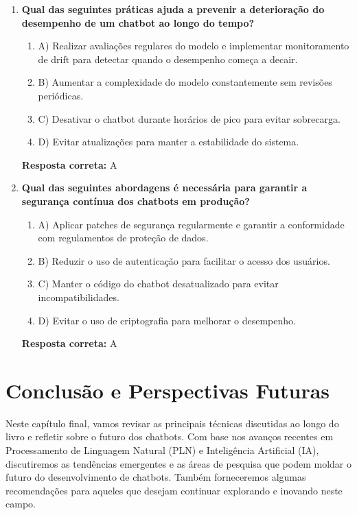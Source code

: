 \documentclass[14pt,a4paper,oneside]{book}
\begin{document}
\begin{enumerate}
	\item \textbf{Qual das seguintes práticas ajuda a prevenir a deterioração do desempenho de um chatbot ao longo do tempo?}
	\begin{enumerate}[label=\alph*)]
		\item A) Realizar avaliações regulares do modelo e implementar monitoramento de drift para detectar quando o desempenho começa a decair.
		\item B) Aumentar a complexidade do modelo constantemente sem revisões periódicas.
		\item C) Desativar o chatbot durante horários de pico para evitar sobrecarga.
		\item D) Evitar atualizações para manter a estabilidade do sistema.
	\end{enumerate}
	\vspace{5mm}
	\textbf{Resposta correta:} A
	
	\item \textbf{Qual das seguintes abordagens é necessária para garantir a segurança contínua dos chatbots em produção?}
	\begin{enumerate}[label=\alph*)]
		\item A) Aplicar patches de segurança regularmente e garantir a conformidade com regulamentos de proteção de dados.
		\item B) Reduzir o uso de autenticação para facilitar o acesso dos usuários.
		\item C) Manter o código do chatbot desatualizado para evitar incompatibilidades.
		\item D) Evitar o uso de criptografia para melhorar o desempenho.
	\end{enumerate}
	\vspace{5mm}
	\textbf{Resposta correta:} A
	
\end{enumerate}


\chapter{Conclusão e Perspectivas Futuras}

Neste capítulo final, vamos revisar as principais técnicas discutidas ao longo do livro e refletir sobre o futuro dos chatbots. Com base nos avanços recentes em Processamento de Linguagem Natural (PLN) e Inteligência Artificial (IA), discutiremos as tendências emergentes e as áreas de pesquisa que podem moldar o futuro do desenvolvimento de chatbots. Também forneceremos algumas recomendações para aqueles que desejam continuar explorando e inovando neste campo.
\end{document}
